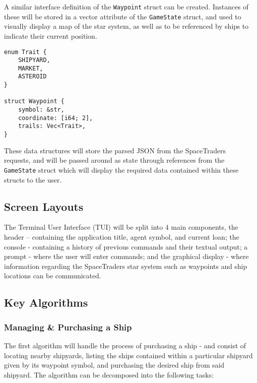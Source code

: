 A similar interface definition of the \texttt{Waypoint} struct can be created. Instances of these will be stored in a vector attribute of the \texttt{GameState} struct, and used to visually display a map of the star system, as well as to be referenced by ships to indicate their current position.
\begin{lstlisting}
enum Trait {
    SHIPYARD,
    MARKET,
    ASTEROID
}

struct Waypoint {
    symbol: &str,
    coordinate: [i64; 2],
    trails: Vec<Trait>,
}
\end{lstlisting}
These data structures will store the parsed JSON from the SpaceTraders requests, and will be passed around as state through references from the \texttt{GameState} struct which will display the required data contained within these structs to the user. 

\subsection{Screen Layouts}
The Terminal User Interface (TUI) will be split into 4 main components, the header – containing the application title, agent symbol, and current loan; the console - containing a history of previous commands and their textual output; a prompt - where the user will enter commands; and the graphical display - where information regarding the SpaceTraders star system such as waypoints and ship locations can be communicated.


\subsection{Key Algorithms}
\subsubsection{Managing \& Purchasing a Ship}
The first algorithm will handle the process of purchasing a ship - and consist of locating nearby shipyards, listing the ships contained within a particular shipyard given by its waypoint symbol, and purchasing the desired ship from said shipyard. The algorithm can be decomposed into the following tasks:

\bigskip


